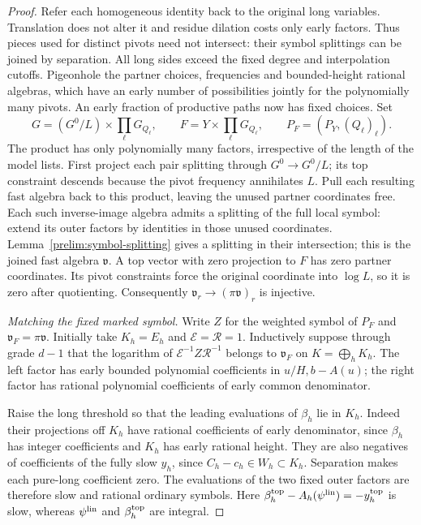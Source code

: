 \begin{proof}
Refer each homogeneous identity back to the original long variables.
Translation does not alter it and residue dilation costs only early
factors.  Thus pieces used for distinct pivots need not intersect:
their symbol splittings can be joined by separation.  All long sides
exceed the fixed degree and interpolation cutoffs.  Pigeonhole the
partner choices, frequencies and bounded-height rational algebras,
which have an early number of possibilities jointly for the
polynomially many pivots.  An early fraction of productive paths now
has fixed choices.  Set
\[
 G=(G^0/L)\times\prod_\ell G_{Q_\ell},\qquad
 F=Y\times\prod_\ell G_{Q_\ell},\qquad
 P_F=(P_Y,(Q_\ell)_\ell).
\]
The product has only polynomially many factors, irrespective of the
length of the model lists.  First project each pair splitting through
$G^0\to G^0/L$; its top constraint descends because the pivot
frequency annihilates $L$.  Pull each resulting fast algebra back
to this product, leaving the unused partner coordinates free.
Each such inverse-image algebra admits a splitting of the full
local symbol: extend its outer factors by identities in those unused
coordinates.  Lemma~\ref{prelim:symbol-splitting} gives a splitting
in their intersection; this is the joined fast algebra $\mathfrak v$.
A top vector with zero projection to $F$ has zero partner
coordinates.  Its pivot constraints force the original coordinate
into $\log L$, so it is zero after quotienting.  Consequently
$\mathfrak v_r\to(\pi\mathfrak v)_r$ is injective.

\emph{Matching the fixed marked symbol.}
Write $Z$ for the weighted symbol of $P_F$ and
$\mathfrak v_F=\pi\mathfrak v$.  Initially take $K_h=E_h$ and
$\mathcal E=\mathcal R=1$.  Inductively suppose through grade $d-1$
that the logarithm of $\mathcal E^{-1}Z\mathcal R^{-1}$ belongs to
$\mathfrak v_F$ on $K=\bigoplus_hK_h$.  The left factor has early
bounded polynomial coefficients in $u/H,b-A(u)$; the right factor
has rational polynomial coefficients of early common denominator.

Raise the long threshold so that the leading evaluations of
$\beta_h$ lie in $K_h$.  Indeed their projections off $K_h$ have
rational coefficients of early denominator, since $\beta_h$ has
integer coefficients and $K_h$ has early rational height.  They are
also negatives of coefficients of the fully slow $y_h$, since
$C_h-c_h\in W_h\subset K_h$.  Separation makes each pure-long
coefficient zero.  The evaluations of the two fixed outer factors
are therefore slow and rational ordinary symbols.  Here
$\beta_h^{\rm top}-A_h(\psi^{\rm lin})=-y_h^{\rm top}$ is slow,
whereas $\psi^{\rm lin}$ and $\beta_h^{\rm top}$ are integral.


\end{proof}
